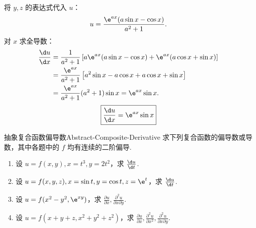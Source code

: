 \begin{solution}
    将 $y, z$ 的表达式代入 $u$：
    \begin{equation}
        u = \frac{\e^{ax}(a \sin x - \cos x)}{a^2 + 1}.
    \end{equation}
    对 $x$ 求全导数：
    \begin{equation}
        \begin{aligned}
            \frac{\d u}{\d x} & = \frac{1}{a^2 + 1} \left[ a \e^{ax}(a \sin x - \cos x) + \e^{ax}(a \cos x + \sin x) \right] \\
                              & = \frac{\e^{ax}}{a^2 + 1} \left[ a^2 \sin x - a \cos x + a \cos x + \sin x \right]           \\
                              & = \frac{\e^{ax}}{a^2 + 1} (a^2 + 1) \sin x = \e^{ax} \sin x.
        \end{aligned}
    \end{equation}
    \begin{equation}
        \boxed{\frac{\d u}{\d x} = \e^{ax} \sin x}
    \end{equation}
\end{solution}

\begin{problem}{抽象复合函数偏导数}{Abstract-Composite-Derivative}
    求下列复合函数的偏导数或导数，其中各题中的 $f$ 均有连续的二阶偏导.
    \begin{enumerate}
        \item 设 $u = f(x, y), x = t^3, y = 2t^2$，求 $\frac{\d u}{\d t}$.
        \item 设 $u = f(x, y, z), x = \sin t, y = \cos t, z = \e^t$，求 $\frac{\d u}{\d t}$.
        \item 设 $u = f(x^2 - y^2, \e^{xy})$，求 $\frac{\partial u}{\partial x}, \frac{\partial^2 u}{\partial x \partial y}$.
        \item 设 $u = f(x+y+z, x^2 + y^2 + z^2)$，求 $\frac{\partial u}{\partial x}, \frac{\partial^2 u}{\partial x^2}, \frac{\partial^2 u}{\partial x \partial y}$.
    \end{enumerate}
\end{problem}

